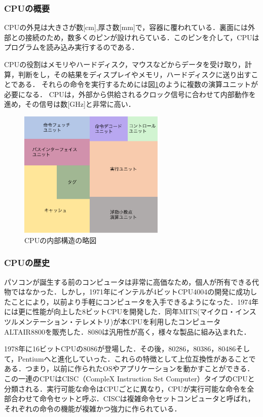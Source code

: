 \documentclass[a4j,12pt]{jsarticle}
\begin{document}
\subsubsection{CPUの概要}
CPUの外見は大きさが数[cm],厚さ数[mm]で，容器に覆われている．裏面には外部との接続のため，数多くのピンが設けれらている．このピンを介して，CPUはプログラムを読み込み実行するのである．

CPUの役割はメモリやハードディスク，マウスなどからデータを受け取り，計算，判断をし，その結果をディスプレイやメモリ，ハードディスクに送り出すことである．
それらの命令を実行するためには図\ref{fig:cpu}のように複数の演算ユニットが必要になる．
CPUは，外部から供給されるクロック信号に合わせて内部動作を進め，その信号は数[GHz]と非常に高い．

\begin{figure}[htbp]
 \begin{center}
  \includegraphics[width=70mm]{CPU.pdf}
 \end{center}
 \caption{CPUの内部構造の略図}
 \label{fig:cpu}
\end{figure}

\subsubsection{CPUの歴史}
パソコンが誕生する前のコンピュータは非常に高価なため，個人が所有できる代物ではなかった．しかし，1971年にインテルが4ビットCPU4004の開発に成功したことにより，以前より手軽にコンピュータを入手できるようになった．1974年には更に性能が向上した8ビットCPUを開発した．同年MITS(マイクロ・インスツルメンテーション・テレメトリ)が本CPUを利用したコンピュータALTAIR8800を販売した．8080は汎用性が高く，様々な製品に組み込まれた．

1978年に16ビットCPUの8086が登場した．その後，80286，80386，80486そして，Pentiumへと進化していった．これらの特徴として上位互換性があることである．つまり，以前に作られたOSやアプリケーションを動かすことができる．この一連のCPUはCISC（CompleX Instruction Set Computer）タイプのCPUと分類される．実行可能な命令はCPUごとに異なり，CPUが実行可能な命令を全部合わせて命令セットと呼ぶ．CISCは複雑命令セットコンピュータと呼ばれ，それぞれの命令の機能が複雑かつ強力に作られている．
\end{document}
